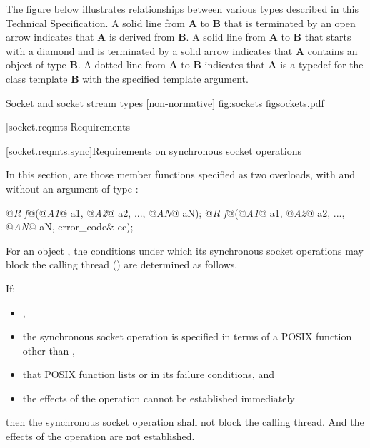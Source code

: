 \pnum
The figure below illustrates relationships between various types described in this Technical Specification. A solid line from \textbf{A} to \textbf{B} that is terminated by an open arrow indicates that \textbf{A} is derived from \textbf{B}. A solid line from \textbf{A} to \textbf{B} that starts with a diamond and is terminated by a solid arrow indicates that \textbf{A} contains an object of type \textbf{B}. A dotted line from \textbf{A} to \textbf{B} indicates that \textbf{A} is a typedef for the class template \textbf{B} with the specified template argument.

\begin{importgraphic}
{Socket and socket stream types [non-normative]}
{fig:sockets}
{figsockets.pdf}
\end{importgraphic}



[socket.reqmts]{Requirements}


[socket.reqmts.sync]{Requirements on synchronous socket operations}

\pnum
In this section,  are those member functions specified as two overloads, with and without an argument of type :

\begin{codeblock}
@\textit{R f}@(@\textit{A1}@ a1, @\textit{A2}@ a2, ..., @\textit{AN}@ aN);
@\textit{R f}@(@\textit{A1}@ a1, @\textit{A2}@ a2, ..., @\textit{AN}@ aN, error_code& ec);
\end{codeblock}

\pnum
For an object , the conditions under which its synchronous socket operations may block the calling thread () are determined as follows.

\pnum
If:

\begin{itemize}
\item
{},
\item
the synchronous socket operation is specified in terms of a POSIX function other than ,
\item
that POSIX function lists  or  in its failure conditions, and
\item
the effects of the operation cannot be established immediately
\end{itemize}

then the synchronous socket operation shall not block the calling thread. \enternote And the effects of the operation are not established. \exitnote

